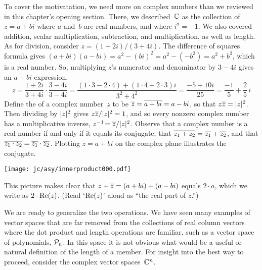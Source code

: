 To cover the motivatation, 
we need more on complex numbers than we reviewed in this 
chapter's opening section.
There, we described~$\mathbb{C}$ as 
the collection of $z=a+bi$ where $a$ and~$b$ are real numbers,
and where $i^2=-1$. 
We also covered addition, scalar multiplication,
subtraction, and multiplication, as well as length.
As for division,  consider $z=(1+2i)/(3+4i)$.
The difference of squares formula
gives $(a+bi)(a-bi)=a^2-(bi)^2=a^2-(-b^2)=a^2+b^2$,
which is a real number.
So, 
multiplying $z$'s numerator and denominator by $3-4i$
gives an $a+bi$ expression.
\begin{equation*}
  z=\frac{1+2i}{3+4i}\cdot\frac{3-4i}{3-4i}
  =
  \frac{(1\cdot 3-2\cdot 4)+(1\cdot 4+2\cdot 3)i}{3^2+4^2}
  =
  \frac{-5+10i}{25}
  =
  \frac{-1}{5}+\frac{2}{5}\,i
\end{equation*}
Define the  of a complex number~$z$
to be $\overline{z}=\overline{a+bi}=a-bi$, so that $z\overline{z}=\lvert z\rvert^2$.
Then dividing by $\lvert z\rvert^2$ gives $z\overline{z}/\lvert z\rvert^2=1$,
and so  
every nonzero complex number has a multiplicative inverse,
$z^{-1}\!=\overline{z}/\lvert z\rvert^2$.
Observe that a complex number is a real number if and only if 
it equals its conjugate, 
that $\overline{z_1+z_2}=\overline{z_1}+\overline{z_2}$,
and that $\overline{z_1\cdot z_2}=\overline{z_1}\cdot\overline{z_2}$.
Plotting $z=a+bi$ on the 
complex plane 
illustrates the conjugate.
\begin{center}
  \texttt{[image: jc/asy/innerproduct000.pdf]}
\end{center}
This picture makes clear that 
$z+\overline{z}=(a+bi)+(a-bi)$ equals
$2\cdot a$, which we write as $2\cdot\mathrm{Re}(z)$.
(Read `$\mathrm{Re}(z)$' aloud as ``the real part of $z$.'')

We are ready to generalize the two operations. 
We have seen many examples of 
vector spaces that are far removed from
the collections of real column vectors where the dot product and
length operations are familiar, such as 
a vector space of polynomials, $\mathcal{P}_n$. 
In this space it is not obvious
what would be a useful or natural definition of the length of a member.
For insight into the best way to proceed, consider the complex
vector spaces~$\mathbb{C}^n$.

